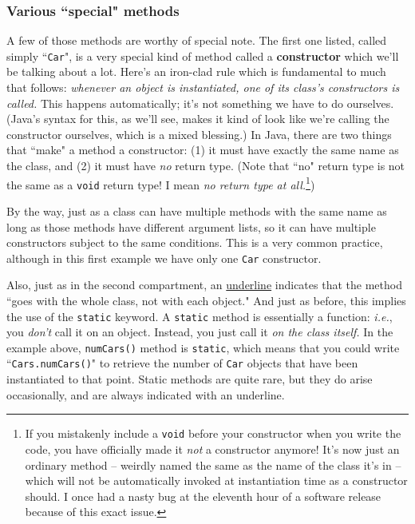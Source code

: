 \subsubsection{Various ``special" methods}
\label{page:instantiateConstructor}

A few of those methods are worthy of special note. The first one listed,
called simply ``\texttt{Car}", is a very special kind of method called a
\textbf{constructor} which we'll be talking about a lot. Here's an iron-clad
rule which is fundamental to much that follows: \textit{whenever an object is
instantiated, one of its class's constructors is called.} This happens
automatically; it's not something we have to do ourselves. (Java's syntax for
this, as we'll see, makes it kind of look like we're calling the constructor
ourselves, which is a mixed blessing.) In Java, there are two things that
``make" a method a constructor: (1) it must have exactly the same name as the
class, and (2) it must have \textit{no} return type. (Note that ``no" return
type is not the same as a \texttt{void} return type! I mean \textit{no return
type at all.}\footnote{If you mistakenly include a \texttt{void} before your
constructor when you write the code, you have officially made it \textit{not}
a constructor anymore! It's now just an ordinary method -- weirdly named the
same as the name of the class it's in -- which will not be automatically
invoked at instantiation time as a constructor should. I once had a nasty bug
at the eleventh hour of a software release because of this exact issue.})

By the way, just as a class can have multiple methods with the same name as
long as those methods have different argument lists, so it can have multiple
constructors subject to the same conditions. This is a very common practice,
although in this first example we have only one \texttt{Car} constructor.

Also, just as in the second compartment, an \underline{underline} indicates
that the method ``goes with the whole class, not with each object." And just
as before, this implies the use of the \texttt{static} keyword. A
\texttt{static} method is essentially a function: \textit{i.e.}, you
\textit{don't} call it on an object. Instead, you just call it \textit{on the
class itself.} In the example above, \texttt{numCars()} method is
\texttt{static}, which means that you could write ``\texttt{Cars.numCars()}"
to retrieve the number of \texttt{Car} objects that have been instantiated to
that point. Static methods are quite rare, but they do arise occasionally, and
are always indicated with an underline.

